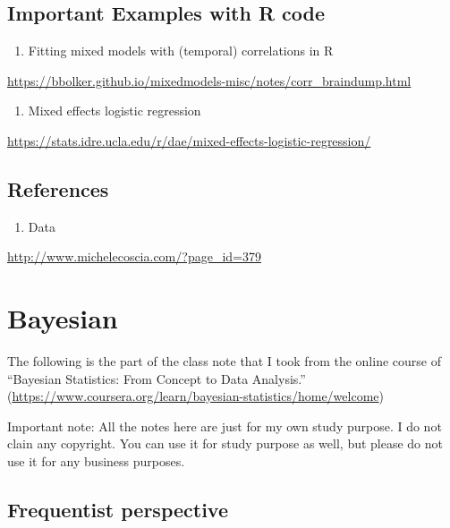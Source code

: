 \documentclass[]{book}
\providecommand{\tightlist}{%
  \setlength{\itemsep}{0pt}\setlength{\parskip}{0pt}}
\begin{document}
\section{Important Examples with R
code}\label{important-examples-with-r-code}

\begin{enumerate}
\def\labelenumi{\arabic{enumi}.}
\tightlist
\item
  Fitting mixed models with (temporal) correlations in R
\end{enumerate}

\url{https://bbolker.github.io/mixedmodels-misc/notes/corr_braindump.html}

\begin{enumerate}
\def\labelenumi{\arabic{enumi}.}
\setcounter{enumi}{1}
\tightlist
\item
  Mixed effects logistic regression
\end{enumerate}

\url{https://stats.idre.ucla.edu/r/dae/mixed-effects-logistic-regression/}

\section{References}\label{references-4}

\begin{enumerate}
\def\labelenumi{\arabic{enumi}.}
\tightlist
\item
  Data
\end{enumerate}

\url{http://www.michelecoscia.com/?page_id=379}

\chapter{Bayesian}\label{bayesian}

The following is the part of the class note that I took from the online
course of ``Bayesian Statistics: From Concept to Data Analysis.''
(\url{https://www.coursera.org/learn/bayesian-statistics/home/welcome})

Important note: All the notes here are just for my own study purpose. I
do not clain any copyright. You can use it for study purpose as well,
but please do not use it for any business purposes.

\section{Frequentist perspective}\label{frequentist-perspective}
\end{document}
